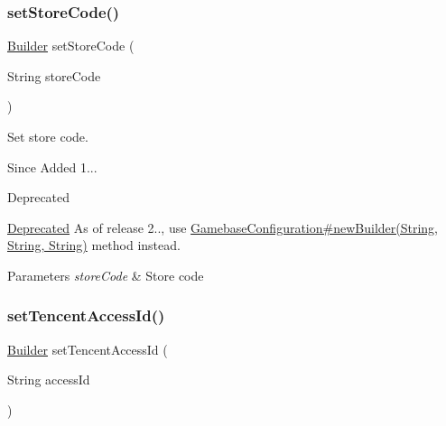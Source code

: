 \subsubsection{\texorpdfstring{set\+Store\+Code()}{setStoreCode()}}
{\footnotesize\ttfamily \hyperlink{classcom_1_1toast_1_1android_1_1gamebase_1_1_gamebase_configuration_1_1_builder}{Builder} set\+Store\+Code (\begin{DoxyParamCaption}\item[{String}]{store\+Code }\end{DoxyParamCaption})}



Set store code. 

\begin{DoxySince}{Since}
Added 1... 
\end{DoxySince}
\begin{DoxyRefDesc}{Deprecated}
\item[\hyperlink{deprecated__deprecated000012}{Deprecated}]As of release 2.., use \hyperlink{classcom_1_1toast_1_1android_1_1gamebase_1_1_gamebase_configuration_a7c28786c8e446dd54cb5f4d0797b6564}{Gamebase\+Configuration\#new\+Builder(\+String, String, String)} method instead. \end{DoxyRefDesc}

\begin{DoxyParams}{Parameters}
{\em store\+Code} & Store code \\
\hline
\end{DoxyParams}
\mbox{\label{classcom_1_1toast_1_1android_1_1gamebase_1_1_gamebase_configuration_1_1_builder_a2b5790c8f47b6ed51ff69b9830ca5a2d}} 
\subsubsection{\texorpdfstring{set\+Tencent\+Access\+Id()}{setTencentAccessId()}}
{\footnotesize\ttfamily \hyperlink{classcom_1_1toast_1_1android_1_1gamebase_1_1_gamebase_configuration_1_1_builder}{Builder} set\+Tencent\+Access\+Id (\begin{DoxyParamCaption}\item[{String}]{access\+Id }\end{DoxyParamCaption})}



